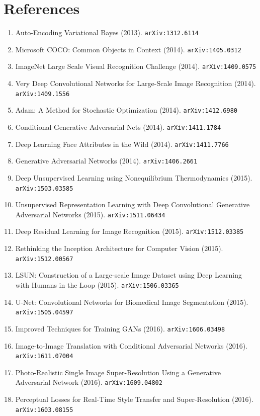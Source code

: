 \documentclass[11pt]{article}
\begin{document}
\section*{References}
\begin{enumerate}\small
  \item Auto-Encoding Variational Bayes (2013). \texttt{arXiv:1312.6114}
  \item Microsoft COCO: Common Objects in Context (2014). \texttt{arXiv:1405.0312}
  \item ImageNet Large Scale Visual Recognition Challenge (2014). \texttt{arXiv:1409.0575}
  \item Very Deep Convolutional Networks for Large-Scale Image Recognition (2014). \texttt{arXiv:1409.1556}
  \item Adam: A Method for Stochastic Optimization (2014). \texttt{arXiv:1412.6980}
  \item Conditional Generative Adversarial Nets (2014). \texttt{arXiv:1411.1784}
  \item Deep Learning Face Attributes in the Wild (2014). \texttt{arXiv:1411.7766}
  \item Generative Adversarial Networks (2014). \texttt{arXiv:1406.2661}
  \item Deep Unsupervised Learning using Nonequilibrium Thermodynamics (2015). \texttt{arXiv:1503.03585}
  \item Unsupervised Representation Learning with Deep Convolutional Generative Adversarial Networks (2015). \texttt{arXiv:1511.06434}
  \item Deep Residual Learning for Image Recognition (2015). \texttt{arXiv:1512.03385}
  \item Rethinking the Inception Architecture for Computer Vision (2015). \texttt{arXiv:1512.00567}
  \item LSUN: Construction of a Large-scale Image Dataset using Deep Learning with Humans in the Loop (2015). \texttt{arXiv:1506.03365}
  \item U-Net: Convolutional Networks for Biomedical Image Segmentation (2015). \texttt{arXiv:1505.04597}
  \item Improved Techniques for Training GANs (2016). \texttt{arXiv:1606.03498}
  \item Image-to-Image Translation with Conditional Adversarial Networks (2016). \texttt{arXiv:1611.07004}
  \item Photo-Realistic Single Image Super-Resolution Using a Generative Adversarial Network (2016). \texttt{arXiv:1609.04802}
  \item Perceptual Losses for Real-Time Style Transfer and Super-Resolution (2016). \texttt{arXiv:1603.08155}

\end{enumerate}
\end{document}
